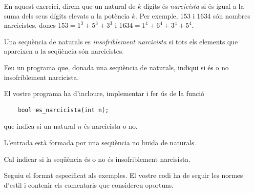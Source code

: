 
\Statement

En aquest exercici, direm que un natural de $k$ digits és \emph{narcicista} si és igual a la suma dels seus dígits elevats a la potència
$k$. Per exemple, 153 i 1634 són nombres narcicistes, doncs $153 = 1^3+5^3+3^3$ i $1634 = 1^4 + 6^4 + 3^4 + 5^4$.

\medskip

Una sequència de naturals es \emph{insofriblement narcicista} si tots els elements que apareixen a la seqüència són narcicistes.

\medskip
Feu un programa que, donada una seqüència de naturals, indiqui si és o no insofriblement narcicista.

\medskip

El vostre programa ha d'incloure, implementar i fer ús de  la funció

\begin{lstlisting}
    bool es_narcicista(int n);
\end{lstlisting}

que indica si un natural $n$ és narcicista o no.

\Input

L'entrada està formada por una seqüència no buida de  naturals.

\Output

Cal indicar si la seqüència és o no és insofriblement narcisista.

\medskip
Seguiu el format especificat als exemples. El vostre codi ha de seguir les normes d'estil i contenir els comentaris que considereu oportuns.

\Sample
